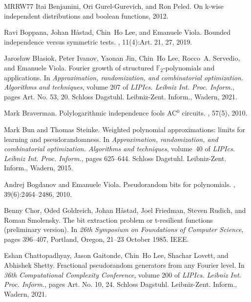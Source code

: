 \documentclass[10pt,a4paper]{article}
\theoremstyle{definition}
\begin{document}
\begin{thebibliography}{MRRW77}
Itai Benjamini, Ori Gurel-Gurevich, and Ron Peled.
\newblock On k-wise independent distributions and boolean functions, 2012.

Ravi Boppana, Johan H{\aa}stad, Chin~Ho Lee, and Emanuele Viola.
\newblock Bounded independence versus symmetric tests.
, 11(4):Art. 21, 27, 2019.

Jaros{\l}aw B{\l}asiok, Peter Ivanov, Yaonan Jin, Chin~Ho Lee, Rocco~A. Servedio, and Emanuele Viola.
\newblock Fourier growth of structured {$\mathbb{F}_2$}-polynomials and applications.
\newblock In {\em Approximation, randomization, and combinatorial optimization. {A}lgorithms and techniques}, volume 207 of {\em LIPIcs. Leibniz Int. Proc. Inform.}, pages Art. No. 53, 20. Schloss Dagstuhl. Leibniz-Zent. Inform., Wadern, 2021.

Mark Braverman.
\newblock Polylogarithmic independence fools {AC}$^{\mbox{0}}$ circuits.
, 57(5), 2010.

Mark Bun and Thomas Steinke.
\newblock Weighted polynomial approximations: limits for learning and pseudorandomness.
\newblock In {\em Approximation, randomization, and combinatorial optimization. {A}lgorithms and techniques}, volume~40 of {\em LIPIcs. Leibniz Int. Proc. Inform.}, pages 625--644. Schloss Dagstuhl. Leibniz-Zent. Inform., Wadern, 2015.

Andrej Bogdanov and Emanuele Viola.
\newblock Pseudorandom bits for polynomials.
, 39(6):2464--2486, 2010.

Benny Chor, Oded Goldreich, Johan H{\r{a}}stad, Joel Friedman, Steven Rudich, and Roman Smolensky.
\newblock The bit extraction problem or {t}-resilient functions (preliminary version).
\newblock In {\em 26th Symposium on Foundations of Computer Science}, pages 396--407, Portland, Oregon, 21--23 October 1985. IEEE.

Eshan Chattopadhyay, Jason Gaitonde, Chin~Ho Lee, Shachar Lovett, and Abhishek Shetty.
\newblock Fractional pseudorandom generators from any {F}ourier level.
\newblock In {\em 36th {C}omputational {C}omplexity {C}onference}, volume 200 of {\em LIPIcs. Leibniz Int. Proc. Inform.}, pages Art. No. 10, 24. Schloss Dagstuhl. Leibniz-Zent. Inform., Wadern, 2021.


\end{thebibliography}
\end{document}
